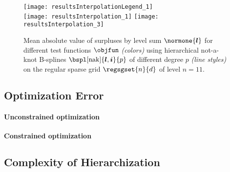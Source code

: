 \begin{figure}
  \texttt{[image: resultsInterpolationLegend\_1]}\\[2mm]%
  \texttt{[image: resultsInterpolation\_1]}%
  \hfill%
  \texttt{[image: resultsInterpolation\_3]}%
  \caption[Decay of surpluses for different test functions]{%
    Mean absolute value of surpluses by level sum $\normone{\*l}$
    for different test functions $\objfun$ \emph{(colors)}
    using hierarchical not-a-knot B-splines
    $\bspl[\nak]{\*l,\*i}{p}$ of different degree $p$ \emph{(line styles)} on
    the regular sparse grid $\regsgset{n}{d}$ of level $n = 11$.%
  }%
  \label{fig:resultDecaySurpluses}%
\end{figure}



\subsection{Optimization Error}
\label{sec:542optimization}

\paragraph{Unconstrained optimization}

\blindtext{}

\paragraph{Constrained optimization}

\blindtext{}



\subsection{Complexity of Hierarchization}
\label{sec:543complexity}

\blindtext{}
